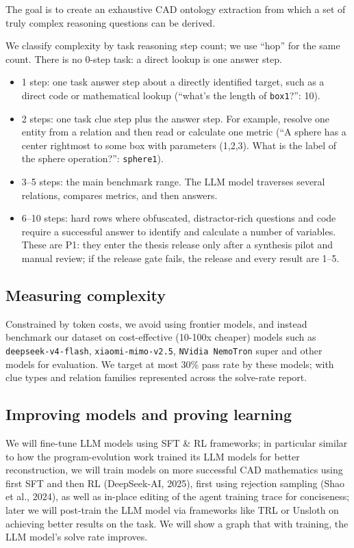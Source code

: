 \documentclass[10pt]{article}
\begin{document}
The goal is to create an exhaustive CAD ontology extraction from which a set of truly complex reasoning questions can be derived.

We classify complexity by task reasoning step count; we use ``hop'' for the same count. There is no 0-step task: a direct lookup is one answer step.

\begin{itemize}
  \item 1 step: one task answer step about a directly identified target, such as a direct code or mathematical lookup (``what's the length of \texttt{box1}?'': 10).
  \item 2 steps: one task clue step plus the answer step. For example, resolve one entity from a relation and then read or calculate one metric (``A sphere has a center rightmost to some box with parameters (1,2,3). What is the label of the sphere operation?'': \texttt{sphere1}).
  \item 3--5 steps: the main benchmark range. The LLM model traverses several relations, compares metrics, and then answers.
  \item 6--10 steps: hard rows where obfuscated, distractor-rich questions and code require a successful answer to identify and calculate a number of variables. These are P1: they enter the thesis release only after a synthesis pilot and manual review; if the release gate fails, the release and every result are 1--5.
\end{itemize}

\subsection{Measuring complexity}

Constrained by token costs, we avoid using frontier models, and instead benchmark our dataset on cost-effective (10-100x cheaper) models such as \texttt{deepseek-v4-flash}, \texttt{xiaomi-mimo-v2.5}, \texttt{NVidia NemoTron} super and other models for evaluation. We target at most 30\% pass rate by these models; with clue types and relation families represented across the solve-rate report.

\subsection{Improving models and proving learning}

We will fine-tune LLM models using SFT \& RL frameworks; in particular similar to how the program-evolution work trained its LLM models for better reconstruction, we will train models on more successful CAD mathematics using first SFT and then RL (DeepSeek-AI, 2025), first using rejection sampling (Shao et al., 2024), as well as in-place editing of the agent training trace for conciseness; later we will post-train the LLM model via frameworks like TRL or Unsloth on achieving better results on the task. We will show a graph that with training, the LLM model's solve rate improves.
\end{document}
